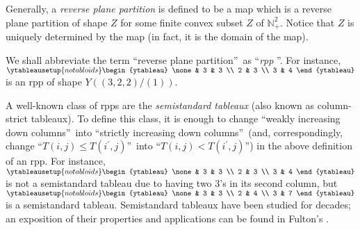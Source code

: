 \documentclass[numbers=enddot,12pt,final,onecolumn,notitlepage]{scrartcl}%
\theoremstyle{definition}
\begin{document}
Generally, a \textit{reverse plane partition} is defined to be a map which is
a reverse plane partition of shape $Z$ for some finite convex subset $Z$ of
$\mathbb{N}_{+}^{2}$. Notice that $Z$ is uniquely determined by the map (in
fact, it is the domain of the map).

We shall abbreviate the term \textquotedblleft reverse plane
partition\textquotedblright\ as \textquotedblleft\textit{rpp}%
\textquotedblright. For instance, $%
\ytableausetup{notabloids}
\begin{ytableau}
\none& 3 & 3 \\
2 & 3 \\
3 & 4
\end{ytableau}%
$ is an rpp of shape $Y\left(  \left(  3,2,2\right)  /\left(  1\right)
\right)  $.

A well-known class of rpps are the \textit{semistandard tableaux} (also known
as column-strict tableaux). To define this class, it is enough to change
\textquotedblleft weakly increasing down columns\textquotedblright\ into
\textquotedblleft strictly increasing down columns\textquotedblright\ (and,
correspondingly, change \textquotedblleft$T\left(  i,j\right)  \leq T\left(
i^{\prime},j\right)  $\textquotedblright\ into \textquotedblleft$T\left(
i,j\right)  <T\left(  i^{\prime},j\right)  $\textquotedblright) in the above
definition of an rpp. For instance, $%
\ytableausetup{notabloids}
\begin{ytableau}
\none& 3 & 3 \\
2 & 3 \\
3 & 4
\end{ytableau}%
$ is not a semistandard tableau due to having two $3$'s in its second column,
but $%
\ytableausetup{notabloids}
\begin{ytableau}
\none& 3 & 3 \\
2 & 4 \\
3 & 7
\end{ytableau}%
$ is a semistandard tableau. Semistandard tableaux have been studied for
decades; an exposition of their properties and applications can be found in
Fulton's \cite{Fulton97}.
\end{document}
